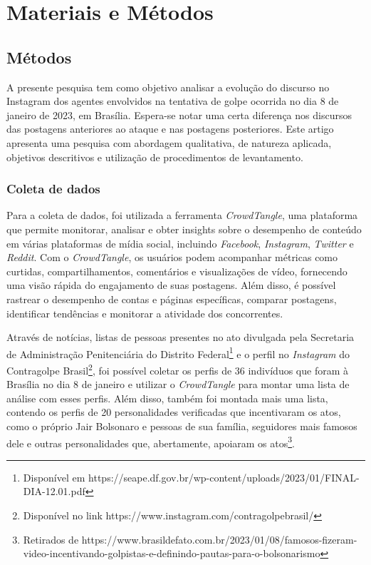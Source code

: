 \documentclass[manuscript,screen,review]{acmart}
\begin{document}
\section{Materiais e Métodos}

\subsection{Métodos}

A presente pesquisa tem como objetivo analisar a evolução do discurso no Instagram dos agentes envolvidos na tentativa de golpe ocorrida no dia 8 de janeiro de 2023, em Brasília. Espera-se notar uma certa diferença nos discursos das postagens anteriores ao ataque e nas postagens posteriores. Este artigo apresenta uma pesquisa com abordagem qualitativa, de natureza aplicada, objetivos descritivos e utilização de procedimentos de levantamento.

\subsubsection{Coleta de dados}

Para a coleta de dados, foi utilizada a ferramenta \textit{CrowdTangle}, uma plataforma que permite monitorar, analisar e obter insights sobre o desempenho de conteúdo em várias plataformas de mídia social, incluindo \textit{Facebook}, \textit{Instagram}, \textit{Twitter} e \textit{Reddit}. Com o \textit{CrowdTangle}, os usuários podem acompanhar métricas como curtidas, compartilhamentos, comentários e visualizações de vídeo, fornecendo uma visão rápida do engajamento de suas postagens. Além disso, é possível rastrear o desempenho de contas e páginas específicas, comparar postagens, identificar tendências e monitorar a atividade dos concorrentes.

Através de notícias, listas de pessoas presentes no ato divulgada pela Secretaria de Administração Penitenciária do Distrito Federal\footnote{Disponível em https://seape.df.gov.br/wp-content/uploads/2023/01/FINAL-DIA-12.01.pdf} e o perfil no \textit{Instagram} do Contragolpe Brasil\footnote{Disponível no link https://www.instagram.com/contragolpebrasil/}, foi possível coletar os perfis de 36 indivíduos que foram à Brasília no dia 8 de janeiro e utilizar o \textit{CrowdTangle} para montar uma lista de análise com esses perfis. Além disso, também foi montada mais uma lista, contendo os perfis de 20 personalidades verificadas que incentivaram os atos, como o próprio Jair Bolsonaro e pessoas de sua família, seguidores mais famosos dele e outras personalidades que, abertamente, apoiaram os atos\footnote{Retirados de https://www.brasildefato.com.br/2023/01/08/famosos-fizeram-video-incentivando-golpistas-e-definindo-pautas-para-o-bolsonarismo}.
\end{document}

